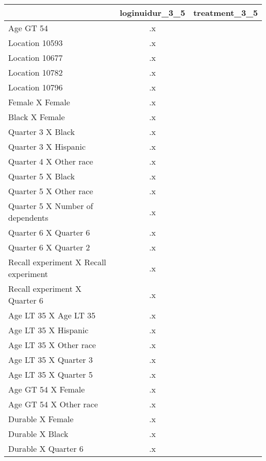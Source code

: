 \begin{tabular}{l*{2}{c}}
\hline\hline
                    &loginuidur\_3\_5&treatment\_3\_5\\
\hline
Age GT 54           &          .x&            \\
Location 10593      &          .x&            \\
Location 10677      &          .x&            \\
Location 10782      &          .x&            \\
Location 10796      &          .x&            \\
Female X Female     &          .x&            \\
Black X Female      &          .x&            \\
Quarter 3 X Black   &          .x&            \\
Quarter 3 X Hispanic&          .x&            \\
Quarter 4 X Other race&          .x&            \\
Quarter 5 X Black   &          .x&            \\
Quarter 5 X Other race&          .x&            \\
Quarter 5 X Number of dependents&          .x&            \\
Quarter 6 X Quarter 6&          .x&            \\
Quarter 6 X Quarter 2&          .x&            \\
Recall experiment X Recall experiment&          .x&            \\
Recall experiment X Quarter 6&          .x&            \\
Age LT 35 X Age LT 35&          .x&            \\
Age LT 35 X Hispanic&          .x&            \\
Age LT 35 X Other race&          .x&            \\
Age LT 35 X Quarter 3&          .x&            \\
Age LT 35 X Quarter 5&          .x&            \\
Age GT 54 X Female  &          .x&            \\
Age GT 54 X Other race&          .x&            \\
Durable X Female    &          .x&            \\
Durable X Black     &          .x&            \\
Durable X Quarter 6 &          .x&            \\

\end{tabular}
